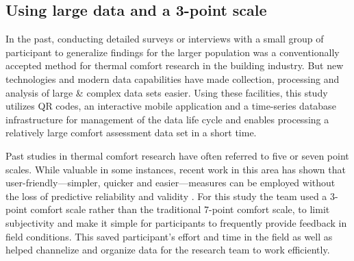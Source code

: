 \documentclass[]{interact}
\theoremstyle{plain}%
\theoremstyle{definition}
\theoremstyle{remark}
\begin{document}
\subsection{Using large data and a 3-point scale}

In the past, conducting detailed surveys or interviews with a small group of participant to generalize findings for the larger population was a conventionally accepted method for thermal comfort research in the building industry. But new technologies and modern data capabilities have made collection, processing and analysis of large \& complex data sets easier. Using these facilities, this study utilizes QR codes, an interactive mobile application and a time-series database infrastructure for management of the data life cycle and enables processing a relatively large comfort assessment data set in a short time. 

Past studies in thermal comfort research have often referred to five or seven point scales. While valuable in some instances, recent work in this area has shown that user-friendly---simpler, quicker and easier---measures can be employed without the loss of predictive reliability and validity \cite{dolnicar2007user, krosnick2018questionnaire, dolnicar2011three}. For this study the team used a 3-point comfort scale rather than the traditional 7-point comfort scale, to limit subjectivity and make it simple for participants to frequently provide feedback in field conditions. This saved participant's effort and time in the field as well as helped channelize and organize data for the research team to work efficiently. 

\end{document}
